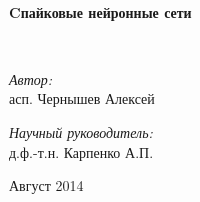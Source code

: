 \begin{titlepage}
\begin{center}
\HRule \\[0.4cm]
{ \huge \bfseries Cпайковые нейронные сети \\[0.4cm] }

\HRule \\[1.5cm]
\begin{minipage}{0.4\textwidth}
\begin{flushleft} \large
\emph{Автор:}\\
асп. Чернышев Алексей
\end{flushleft}
\end{minipage}
\begin{minipage}{0.4\textwidth}
\begin{flushright} \large
\emph{Научный руководитель:} \\
д.ф.-т.н. Карпенко А.П.
\end{flushright}
\end{minipage}

\vfill

{\large Август 2014}

\end{center}
\end{titlepage}
